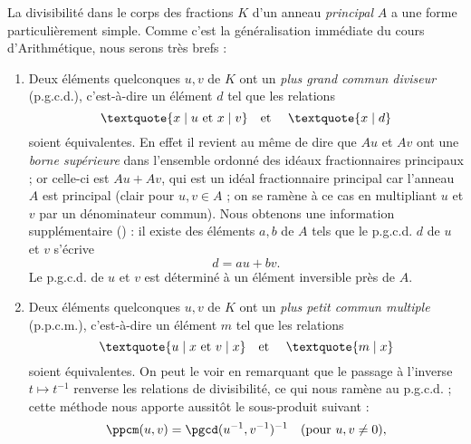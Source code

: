 \documentclass[11pt, %
  title in boldface,
  theorem in new line,
  theorem numbering = section,
  number theorems separately,
  simple name,
]{beaulivre}
\begin{document}
    La divisibilité dans le corps des fractions \( K \) d'un anneau \emph{principal} \( A \) a une forme particulièrement simple. Comme c'est la généralisation immédiate du cours d'Arithmétique, nous serons très brefs :
    \begin{enumerate}[itemsep=.3\baselineskip]
        \item \label{divisibilité dans le corps des fractions;pgcd} Deux éléments quelconques \( u,v \) de \( K \) ont un \emph{plus grand commun diviseur} (p.g.c.d.), c'est-à-dire un élément \( d \) tel que les relations
        \begin{equation}
            \text{\textquote{\( x \mid u \) et \( x \mid v \)}\quad et \quad \textquote{\( x \mid d \)}}
        \end{equation}
        soient équivalentes. En effet il revient au même de dire que \( Au \) et \( Av \) ont une \emph{borne supérieure} dans l'ensemble ordonné des idéaux fractionnaires principaux ; or celle-ci est \( Au+Av \), qui est un idéal fractionnaire principal car l'anneau \( A \) est principal (clair pour \( u,v \in A \) ; on se ramène à ce cas en multipliant \( u \) et \( v \) par un dénominateur commun). Nous obtenons une information supplémentaire () : il existe des éléments \( a,b \) de \( A \) tels que le p.g.c.d. \( d \) de \( u \) et \( v \) s'écrive
        \begin{equation}
            d = au+bv. \label{eq:bezout}
        \end{equation}
        Le p.g.c.d. de \( u \) et \( v \) est déterminé à un élément inversible près de \( A \).
        \item Deux éléments quelconques \( u,v \) de \( K \) ont un \emph{plus petit commun multiple} (p.p.c.m.), c'est-à-dire un élément \( m \) tel que les relations
        \begin{equation}
            \text{\textquote{\( u \mid x \) et \( v \mid x \)}\quad et \quad \textquote{\( m \mid x \)}}
        \end{equation}
        soient équivalentes. On peut le voir en remarquant que le passage à l'inverse \( t \mapsto t^{-1} \) renverse les relations de divisibilité, ce qui nous ramène au p.g.c.d. ; cette méthode nous apporte aussitôt le sous-produit suivant :
        \begin{equation}
            \ppcm(u,v) = \pgcd(u^{-1},v^{-1})^{-1} \quad (\text{pour } u,v \neq 0),

\end{equation}
\end{enumerate}
\end{document}
